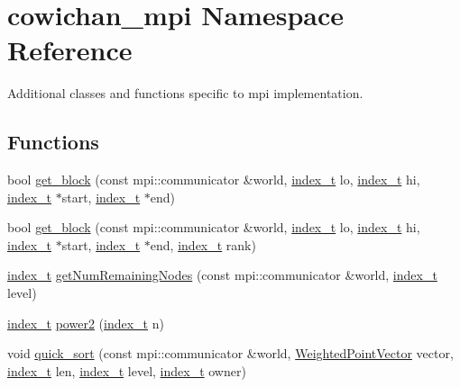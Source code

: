 \hypertarget{namespacecowichan__mpi}{
\section{cowichan\_\-mpi Namespace Reference}
\label{namespacecowichan__mpi}
}
Additional classes and functions specific to mpi implementation.  


\subsection*{Functions}
\begin{CompactItemize}
\item 
bool \hyperlink{namespacecowichan__mpi_bb7c07d8b23660efe06c7ee12d60bbdc}{get\_\-block} (const mpi::communicator \&world, \hyperlink{cowichan_8hpp_5b04577d5d21124855deaad298595371}{index\_\-t} lo, \hyperlink{cowichan_8hpp_5b04577d5d21124855deaad298595371}{index\_\-t} hi, \hyperlink{cowichan_8hpp_5b04577d5d21124855deaad298595371}{index\_\-t} $\ast$start, \hyperlink{cowichan_8hpp_5b04577d5d21124855deaad298595371}{index\_\-t} $\ast$end)
\item 
bool \hyperlink{namespacecowichan__mpi_413bf41c8bf73b560d1c16a8e5206e5f}{get\_\-block} (const mpi::communicator \&world, \hyperlink{cowichan_8hpp_5b04577d5d21124855deaad298595371}{index\_\-t} lo, \hyperlink{cowichan_8hpp_5b04577d5d21124855deaad298595371}{index\_\-t} hi, \hyperlink{cowichan_8hpp_5b04577d5d21124855deaad298595371}{index\_\-t} $\ast$start, \hyperlink{cowichan_8hpp_5b04577d5d21124855deaad298595371}{index\_\-t} $\ast$end, \hyperlink{cowichan_8hpp_5b04577d5d21124855deaad298595371}{index\_\-t} rank)
\item 
\hyperlink{cowichan_8hpp_5b04577d5d21124855deaad298595371}{index\_\-t} \hyperlink{namespacecowichan__mpi_7f82c459ad086060228b2bd8100bf9c7}{getNumRemainingNodes} (const mpi::communicator \&world, \hyperlink{cowichan_8hpp_5b04577d5d21124855deaad298595371}{index\_\-t} level)
\item 
\hyperlink{cowichan_8hpp_5b04577d5d21124855deaad298595371}{index\_\-t} \hyperlink{namespacecowichan__mpi_a7c14e0bec9c9da1d56a348c9a0cf1f8}{power2} (\hyperlink{cowichan_8hpp_5b04577d5d21124855deaad298595371}{index\_\-t} n)
\item 
void \hyperlink{namespacecowichan__mpi_4ab537d0df99e9011b206c7259e82d35}{quick\_\-sort} (const mpi::communicator \&world, \hyperlink{class_weighted_point}{WeightedPointVector} vector, \hyperlink{cowichan_8hpp_5b04577d5d21124855deaad298595371}{index\_\-t} len, \hyperlink{cowichan_8hpp_5b04577d5d21124855deaad298595371}{index\_\-t} level, \hyperlink{cowichan_8hpp_5b04577d5d21124855deaad298595371}{index\_\-t} owner)

\end{CompactItemize}
